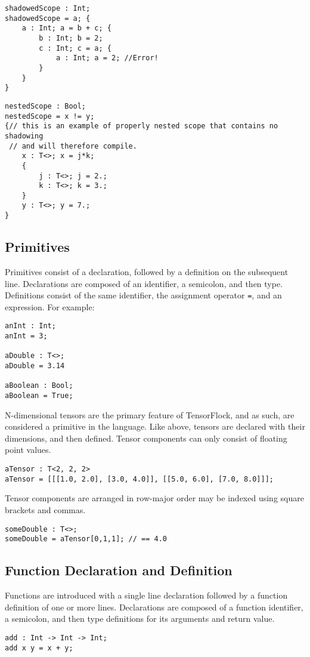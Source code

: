 \begin{lstlisting}
shadowedScope : Int;
shadowedScope = a; {
    a : Int; a = b + c; {
        b : Int; b = 2;
        c : Int; c = a; { 
            a : Int; a = 2; //Error!
        }
    }
}
\end{lstlisting}

\begin{lstlisting}
nestedScope : Bool;
nestedScope = x != y;
{// this is an example of properly nested scope that contains no shadowing
 // and will therefore compile.
    x : T<>; x = j*k;
    { 
        j : T<>; j = 2.;
        k : T<>; k = 3.;
    }
    y : T<>; y = 7.;
}    
\end{lstlisting}

\subsection{Primitives}
Primitives consist of a declaration, followed by a definition on the subsequent line. 
Declarations are composed of an identifier, a semicolon, and then type. 
Definitions consist of the same identifier, the assignment operator \lstinline|=|, 
and an expression. For example:
\begin{lstlisting}
anInt : Int;
anInt = 3;

aDouble : T<>;
aDouble = 3.14

aBoolean : Bool;
aBoolean = True;
\end{lstlisting}

N-dimensional tensors are the primary feature of TensorFlock, and as such, 
are considered a primitive in the language. Like above, tensors are declared 
with their dimensions, and then defined. Tensor components can only consist of
floating point values. 
\begin{lstlisting}
aTensor : T<2, 2, 2>
aTensor = [[[1.0, 2.0], [3.0, 4.0]], [[5.0, 6.0], [7.0, 8.0]]];
\end{lstlisting}
Tensor components are arranged in row-major order may be indexed using square
brackets and commas.
\begin{lstlisting}
someDouble : T<>;
someDouble = aTensor[0,1,1]; // == 4.0
\end{lstlisting}
\subsection{Function Declaration and Definition}
Functions are introduced with a single line declaration followed by a function definition of 
one or more lines. Declarations are composed of a function identifier, a semicolon, 
and then type definitions for its arguments and return value.
\begin{lstlisting}
add : Int -> Int -> Int;
add x y = x + y;
\end{lstlisting}
